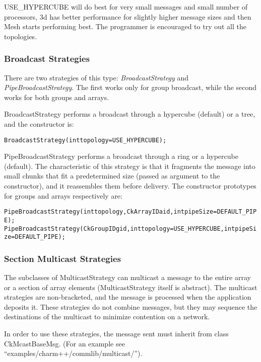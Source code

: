 {USE\_HYPERCUBE will do best for very small messages and small number of
processors, 3d has better performance for slightly higher message sizes and then
Mesh starts performing best. The programmer is encouraged to try out all the
topologies.


\subsubsection{Broadcast Strategies}

There are two strategies of this type: {\em BroadcastStrategy} and {\em
PipeBroadcastStrategy}. The first works only for group broadcast, while the
second works for both groups and arrays.

BroadcastStrategy performs a broadcast through a hypercube (default) or a tree,
and the constructor is:

\begin{alltt}
BroadcastStrategy(int topology=USE_HYPERCUBE);
\end{alltt}

PipeBroadcastStrategy performs a broadcast through a ring or a hypercube
(default). The characteristic of this strategy is that it fragments the message
into small chunks that fit a predetermined size (passed as argument to the
constructor), and it reassembles them before delivery. The constructor
prototypes for groups and arrays respectively are:

\begin{alltt}
PipeBroadcastStrategy(int topology, CkArrayID aid, int pipeSize=DEFAULT_PIPE);
PipeBroadcastStrategy(CkGroupID gid, int topology=USE_HYPERCUBE, int pipeSize=DEFAULT_PIPE);
\end{alltt}


\subsubsection{Section Multicast Strategies}

The subclasses of MulticastStrategy can multicast a message to the entire array
or a section of array elements (MulticastStrategy itself is abstract). The
multicast strategies are non-bracketed, and the message is processed when the
application deposits it. These strategies do not combine messages, but they may
sequence the destinations of the multicast to minimize contention on a network.

In order to use these strategies, the message sent must inherit from class
{\textrm{CkMcastBaseMsg}}. (For an example see
``examples/charm++/commlib/multicast/'').

}
